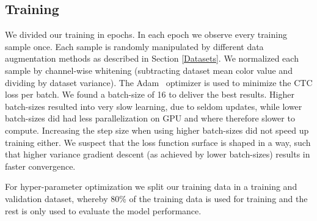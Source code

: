 \subsection{Training}\label{subsec:training}

We divided our training in epochs.
In each epoch we observe every training sample once.
Each sample is randomly manipulated by different data augmentation methods as described in Section \ref{Datasets}.
We normalized each sample by channel-wise whitening (subtracting dataset mean color value and dividing by dataset variance).
The Adam~\cite{Adam} optimizer is used to minimize the CTC loss per batch.
We found a batch-size of 16 to deliver the best results.
Higher batch-sizes resulted into very slow learning, due to seldom updates, while lower batch-sizes did had less parallelization on GPU and where therefore slower to compute.
Increasing the step size when using higher batch-sizes did not speed up training either.
We suspect that the loss function surface is shaped in a way, such that higher variance gradient descent (as achieved by lower batch-sizes) results in faster convergence.

For hyper-parameter optimization we split our training data in a training and validation dataset, whereby 80\% of the training data is used for training and the rest is only used to evaluate the model performance.
